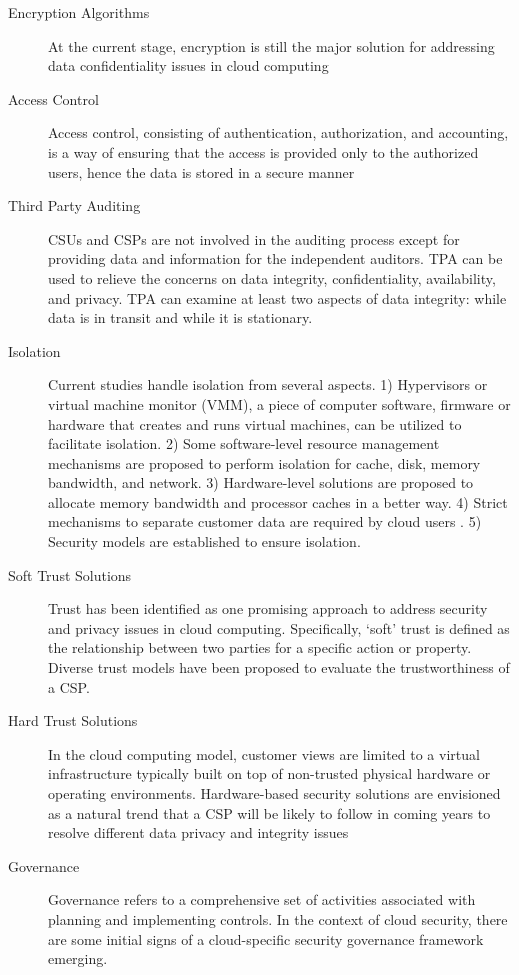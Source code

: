 \documentclass[a4paper]{article}
\begin{document}
\begin{description}
	\item[Encryption Algorithms] At the current stage, encryption is still the major solution for addressing data confidentiality issues in cloud
	computing
	\item[Access Control] Access control, consisting of authentication, authorization, and accounting, is a way of ensuring that the access
	is provided only to the authorized users, hence the data is stored in a secure manner
	\item[Third Party Auditing] CSUs and CSPs are not involved in the auditing process except for providing data and information for the independent auditors. TPA can be used to relieve the concerns on data integrity,	confidentiality, availability, and privacy. TPA can
	examine at least two aspects of data integrity: while data is in transit and while it is stationary.
	\item[Isolation] Current studies handle isolation from several aspects.
	1) Hypervisors or virtual machine monitor (VMM), a
	piece of computer software, firmware or hardware that
	creates and runs virtual machines, can be utilized to facilitate
	isolation. 2) Some software-level resource management mechanisms
	are proposed to perform isolation for cache, disk, memory bandwidth, and network. 3) Hardware-level solutions are proposed to allocate memory
	bandwidth and processor caches in a better way. 4) Strict mechanisms to separate customer data are required by cloud users . 5) Security models are established	to ensure isolation.
	\item[Soft Trust Solutions] Trust has been identified as one promising approach to address security and privacy issues in cloud computing. Specifically, ‘soft’ trust is defined as the relationship between two parties	for a specific action or property. Diverse trust models have been proposed to evaluate the trustworthiness of a CSP.
	\item[Hard Trust Solutions] In the cloud computing model, customer views are limited to a virtual infrastructure typically built on top of
	non-trusted physical hardware or operating environments.
	Hardware-based security solutions are envisioned as a
	natural trend that a CSP will be likely to follow in coming
	years to resolve different data privacy and integrity issues
	\item[Governance] Governance refers to a comprehensive set of activities
	associated with planning and implementing controls. In
	the context of cloud security, there are some initial signs of a cloud-specific security governance
	framework emerging.
\end{description}
\end{document}
